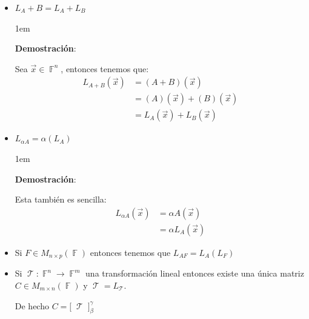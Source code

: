 \documentclass[12pt, fleqn]{report}                             %
\newenvironment{SmallIndentation}[1][0.75em]                    %
        {\begin{adjustwidth}{#1}{}\begin{footnotesize}}             %
        {\end{footnotesize}\end{adjustwidth}}                       %
\theoremstyle{break}                                            %
\DeclareMathOperator \GenericField {\mathbb{F}}                 %
\DeclareMathOperator \LinTrans {\mathcal{T}}                    %
\newcommand{\bigBrackets}[1] {\big[ \; #1 \; \big]}             %
\begin{document}
\begin{itemize}
\begin{SmallIndentation}[1em]
                        \end{SmallIndentation}
                            

                    \item
                        $L_A+B = L_A + L_B$

                        \begin{SmallIndentation}[1em]
                            \textbf{Demostración}:
                            
                            Sea $\vec x \in \GenericField^n$, entonces tenemos que:
                            \begin{align*}
                                L_{A + B}(\vec x)
                                    &= (A + B)(\vec x)              \\
                                    &= (A)(\vec x) + (B)(\vec x)    \\
                                    &= L_A(\vec x) + L_B(\vec x) 
                            \end{align*}
                        
                        \end{SmallIndentation}
                            

                    \item
                        $L_{\alpha A} = \alpha (L_A)$

                        \begin{SmallIndentation}[1em]
                            \textbf{Demostración}:
                            
                            Esta también es sencilla:
                            \begin{align*}
                                L_{\alpha A}(\vec x)
                                    &= \alpha A(\vec x)         \\
                                    &= \alpha L_A(\vec x)
                            \end{align*}
                        
                        \end{SmallIndentation}

                    \item
                        Si $F \in M_{n \times p}(\GenericField)$ entonces tenemos
                        que $L_{AF} = L_A(L_F)$

                    \item
                        Si $\LinTrans: \GenericField^n \to \GenericField^m$ una transformación
                        lineal entonces existe una única matriz  $C \in M_{m \times n}(\GenericField)$
                        y $\LinTrans = L_{\LinTrans}$.

                        De hecho $C = \bigBrackets{\LinTrans}_\beta^\gamma$

                \end{itemize}
\end{document}
